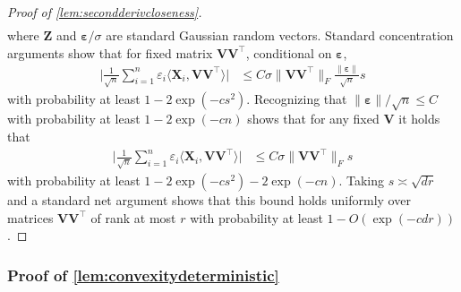 \documentclass[10pt]{article}
\newcommand{\eps}{\ensuremath{\varepsilon}}
\renewcommand{\t}{^{\top}}
\theoremstyle{definition}
\begin{document}
\begin{proof}[Proof of \cref{lem:secondderivcloseness}]
\begin{align}
\end{align}
where $\bm{Z}$ and $\bm{\eps}/\sigma $ are standard Gaussian random vectors.  Standard concentration arguments show that for fixed matrix $\bm{VV}\t$, conditional on $\bm{\eps}$, 
\begin{align}
  \bigg|  \frac{1}{\sqrt{n}} \sum_{i=1}^{n}  \eps_i \bigg \langle \bm{X}_i ,\bm{V} \bm{V}\t \bigg \rangle \bigg| &\leq C \sigma \| \bm{VV}\t \|_F \frac{\| \bm{\eps} \|}{\sqrt{n}} s
\end{align}
with probability at least $1 - 2\exp(-c s^2)$.  Recognizing that $\| \bm{\eps} \|/\sqrt{n} \leq C$ with probability at least $1 - 2 \exp( - c n)$ shows that for any fixed $\bm{V}$ it holds that 
\begin{align}
     \bigg|  \frac{1}{\sqrt{n}} \sum_{i=1}^{n}  \eps_i \bigg \langle \bm{X}_i ,\bm{V} \bm{V}\t \bigg \rangle \bigg| &\leq C \sigma  \| \bm{VV}\t \|_F  s
\end{align}
with probability at least $1 - 2 \exp(- c s^2) - 2 \exp( - c n)$.  Taking $s \asymp \sqrt{dr}$ and a standard net argument shows that this bound holds uniformly over matrices $\bm{VV}\t$ of rank at most $r$ with probability  at least $1 - O( \exp( - c dr ) )$.  
\end{proof}

\subsubsection{Proof of \cref{lem:convexitydeterministic}} \label{sec:convexitydeterministicproof}
\end{document}
